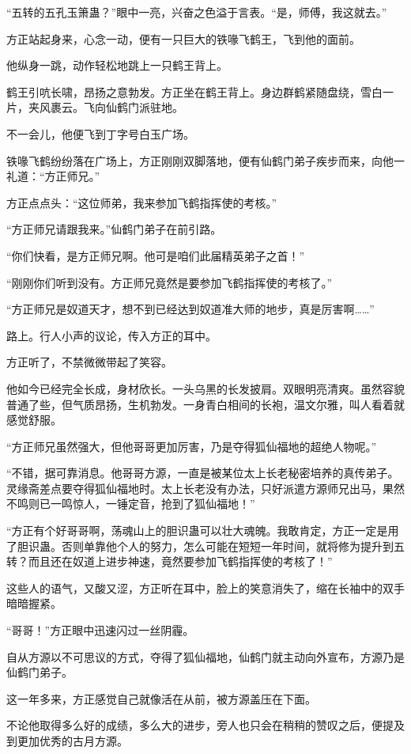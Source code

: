 \begin{this_body}
“五转的五孔玉箫蛊？”眼中一亮，兴奋之色溢于言表。“是，师傅，我这就去。”

方正站起身来，心念一动，便有一只巨大的铁喙飞鹤王，飞到他的面前。

他纵身一跳，动作轻松地跳上一只鹤王背上。

鹤王引吭长啸，昂扬之意勃发。方正坐在鹤王背上。身边群鹤紧随盘绕，雪白一片，夹风裹云。飞向仙鹤门派驻地。

不一会儿，他便飞到丁字号白玉广场。

铁喙飞鹤纷纷落在广场上，方正刚刚双脚落地，便有仙鹤门弟子疾步而来，向他一礼道：“方正师兄。”

方正点点头：“这位师弟，我来参加飞鹤指挥使的考核。”

“方正师兄请跟我来。”仙鹤门弟子在前引路。

“你们快看，是方正师兄啊。他可是咱们此届精英弟子之首！”

“刚刚你们听到没有。方正师兄竟然是要参加飞鹤指挥使的考核了。”

“方正师兄是奴道天才，想不到已经达到奴道准大师的地步，真是厉害啊……”

路上。行人小声的议论，传入方正的耳中。

方正听了，不禁微微带起了笑容。

他如今已经完全长成，身材欣长。一头乌黑的长发披肩。双眼明亮清爽。虽然容貌普通了些，但气质昂扬，生机勃发。一身青白相间的长袍，温文尔雅，叫人看着就感觉舒服。

“方正师兄虽然强大，但他哥哥更加厉害，乃是夺得狐仙福地的超绝人物呢。”

“不错，据可靠消息。他哥哥方源，一直是被某位太上长老秘密培养的真传弟子。灵缘斋差点要夺得狐仙福地时。太上长老没有办法，只好派遣方源师兄出马，果然不鸣则已一鸣惊人，一锤定音，抢到了狐仙福地！”

“方正有个好哥哥啊，荡魂山上的胆识蛊可以壮大魂魄。我敢肯定，方正一定是用了胆识蛊。否则单靠他个人的努力，怎么可能在短短一年时间，就将修为提升到五转？而且还在奴道上进步神速，竟然要参加飞鹤指挥使的考核了！”

这些人的语气，又酸又涩，方正听在耳中，脸上的笑意消失了，缩在长袖中的双手暗暗握紧。

“哥哥！”方正眼中迅速闪过一丝阴霾。

自从方源以不可思议的方式，夺得了狐仙福地，仙鹤门就主动向外宣布，方源乃是仙鹤门弟子。

这一年多来，方正感觉自己就像活在从前，被方源盖压在下面。

不论他取得多么好的成绩，多么大的进步，旁人也只会在稍稍的赞叹之后，便提及到更加优秀的古月方源。


\end{this_body}
